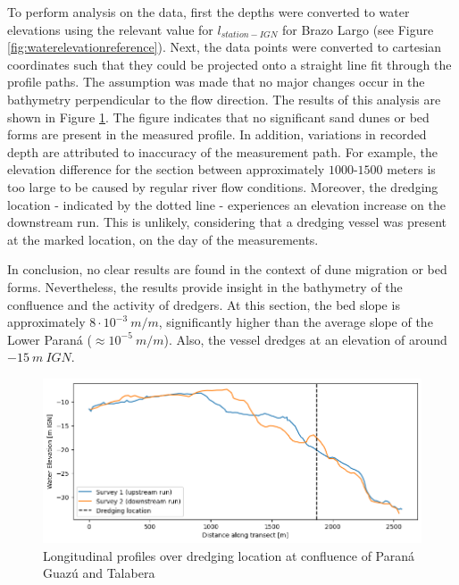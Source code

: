 To perform analysis on the data, first the depths were converted to water elevations using the relevant value for $l_{station-IGN}$ for Brazo Largo (see Figure \ref{fig:waterelevationreference}). Next, the data points were converted to cartesian coordinates such that they could be projected onto a straight line fit through the profile paths. The assumption was made that no major changes occur in the bathymetry perpendicular to the flow direction. The results of this analysis are shown in Figure \ref{fig:longitudinal profiles}. The figure indicates that no significant sand dunes or bed forms are present in the measured profile. In addition, variations in recorded depth are attributed to inaccuracy of the measurement path. For example, the elevation difference for the section between approximately $1000$-$1500$ meters is too large to be caused by regular river flow conditions. Moreover, the dredging location - indicated by the dotted line - experiences an elevation increase on the downstream run. This is unlikely, considering that a dredging vessel was present at the marked location, on the day of the measurements.

In conclusion, no clear results are found in the context of dune migration or bed forms. Nevertheless, the results provide insight in the bathymetry of the confluence and the activity of dredgers. At this section, the bed slope is approximately $8 \cdot 10^{-3} ~m/m$, significantly higher than the average slope of the Lower Paraná ($\approx 10^{-5} ~m/m$). Also, the vessel dredges at an elevation of around $-15 ~m ~IGN$. 

\begin{figure}
    \centering
    \includegraphics[width=0.75\linewidth]{figures/ch6/longitudinal profiles.png}
    \caption{Longitudinal profiles over dredging location at confluence of Paraná Guazú and Talabera}
    \label{fig:longitudinal profiles}
\end{figure}


\newpage
